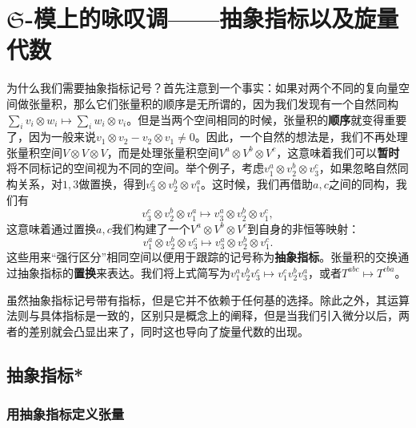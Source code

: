 \chapter{$\mathfrak{S}$-模上的咏叹调——抽象指标以及旋量代数}

为什么我们需要抽象指标记号？首先注意到一个事实：如果对两个不同的复向量空间做张量积，那么它们张量积的顺序是无所谓的，因为我们发现有一个自然同构$\sum _{i} v_{i} \otimes w_{i} \mapsto \sum _{i} w_{i} \otimes v_{i}$。但是当两个空间相同的时候，张量积的\textbf{顺序}就变得重要了，因为一般来说$v_{1} \otimes v_{2} -v_{2} \otimes v_{1} \neq 0$。因此，一个自然的想法是，我们不再处理张量积空间$V\otimes V\otimes V$，而是处理张量积空间$V^{a} \otimes V^{b} \otimes V^{c}$，这意味着我们可以\textbf{暂时}将不同标记的空间视为不同的空间。举个例子，考虑$v_{1}^{a} \otimes v_{2}^{b} \otimes v_{3}^{c}$，如果忽略自然同构关系，对$1,3$做置换，得到$v_{3}^{c} \otimes v_{2}^{b} \otimes v_{1}^{a}$。这时候，我们再借助$a,c$之间的同构，我们有
\begin{equation*}
	v_{3}^{c} \otimes v_{2}^{b} \otimes v_{1}^{a} \mapsto v_{3}^{a} \otimes v_{2}^{b} \otimes v_{1}^{c} ,
\end{equation*}
这意味着通过置换$a,c$我们构建了一个$V^{a} \otimes V^{b} \otimes V^{c}$到自身的非恒等映射：
\begin{equation*}
	v_{1}^{a} \otimes v_{2}^{b} \otimes v_{3}^{c} \mapsto v_{3}^{a} \otimes v_{2}^{b} \otimes v_{1}^{c} .
\end{equation*}
这些用来“强行区分”相同空间以便用于跟踪的记号称为\textbf{抽象指标}。张量积的交换通过抽象指标的\textbf{置换}来表达。我们将上式简写为$v_{1}^{a} v_{2}^{b} v_{3}^{c} \mapsto v_{1}^{c} v_{2}^{b} v_{3}^{a}$，或者$T^{abc} \mapsto T^{cba}$。

虽然抽象指标记号带有指标，但是它并不依赖于任何基的选择。除此之外，其运算法则与具体指标是一致的，区别只是概念上的阐释，但是当我们引入微分以后，两者的差别就会凸显出来了，同时这也导向了旋量代数的出现。


\section{抽象指标*}
\subsection{用抽象指标定义张量}

